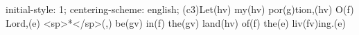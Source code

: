 initial-style: 1;
centering-scheme: english;
(c3)Let(hv) my(hv) por(g)tion,(hv) O(f) Lord,(e) <sp>*</sp>(,) be(gv) in(f) the(gv) land(hv) of(f) the(e) liv(fv)ing.(e)
